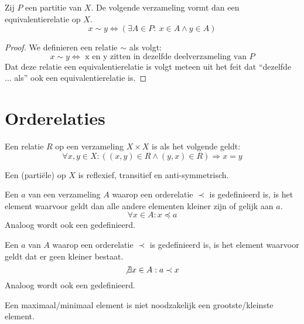 \documentclass[main.tex]{subfiles}
\begin{document}
\begin{st}
  \label{st:partitie-equivalentierelatie}
  Zij $P$ een partitie van $X$.
  De volgende verzameling vormt dan een equivalentierelatie op $X$.
  \[ x \sim y \Leftrightarrow (\exists A \in P:\ x \in A \wedge y \in A )\]

  \begin{proof}
    We definieren een relatie $\sim$ als volgt:
    \[
    x \sim y \Leftrightarrow \text{ x en y zitten in dezelfde deelverzameling van } P
    \]
    Dat deze relatie een equivalentierelatie is volgt meteen uit het feit dat ``dezelfde ... als'' ook een equivalentierelatie is.
  \end{proof}
\end{st}

\section{Orderelaties}
\label{sec:orderelaties}

\begin{de}
  Een relatie $R$ op een verzameling $X \times X$ is  als het volgende geldt:
  \[ \forall x,y \in X: ((x,y) \in R \wedge (y,x) \in R) \Rightarrow x = y \]
\end{de}

\begin{de}
  Een (parti\"ele)  op $X$ is reflexief, transitief en anti-symmetrisch.
\end{de}

\begin{de}
  Een  $a$ van een verzameling $A$ waarop een orderelatie $\prec$ is gedefinieerd is, is het element waarvoor geldt dan alle andere elementen kleiner zijn of gelijk aan $a$.
  \[ \forall x \in A: x \preceq a \] 
  Analoog wordt ook een  gedefinieerd.
\end{de}

\begin{de}
  Een  $a$ van $A$ waarop een orderelatie $\prec$ is gedefinieerd is, is het element waarvoor geldt dat er geen kleiner bestaat.
  \[ \not\exists x \in A: a \prec x \]
  Analoog wordt ook een  gedefinieerd.
\end{de}

\begin{opm}
  Een maximaal/minimaal element is niet noodzakelijk een grootste/kleinste element.    
\end{opm}
\end{document}
